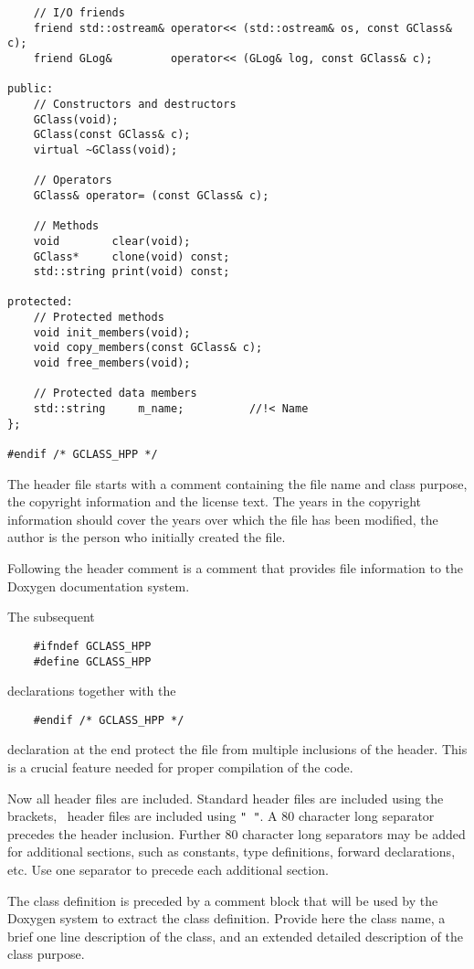 \documentclass{article}[12pt,a4]
\begin{document}
\begin{verbatim}
    // I/O friends
    friend std::ostream& operator<< (std::ostream& os, const GClass& c);
    friend GLog&         operator<< (GLog& log, const GClass& c);

public:
    // Constructors and destructors
    GClass(void);
    GClass(const GClass& c);
    virtual ~GClass(void);
 
    // Operators
    GClass& operator= (const GClass& c);

    // Methods
    void        clear(void);
    GClass*     clone(void) const;
    std::string print(void) const;
  
protected:
    // Protected methods
    void init_members(void);
    void copy_members(const GClass& c);
    void free_members(void);

    // Protected data members
    std::string     m_name;          //!< Name
};

#endif /* GCLASS_HPP */
\end{verbatim}

The header file starts with a comment containing the file name and class purpose, the
copyright information and the license text.
The years in the copyright information should cover the years over which the file has been
modified, the author is the person who initially created the file.

Following the header comment is a comment that provides file information to the
Doxygen documentation system.

The subsequent
\begin{verbatim}
    #ifndef GCLASS_HPP
    #define GCLASS_HPP
\end{verbatim}
declarations together with the 
\begin{verbatim}
    #endif /* GCLASS_HPP */
\end{verbatim}
declaration at the end protect the file from multiple inclusions of the header.
This is a crucial feature needed for proper compilation of the code.

Now all header files are included.
Standard header files are included using the {\tt < >} brackets, \this\ header files are included
using {\tt " "}.
A 80 character long separator precedes the header inclusion.
Further 80 character long separators may be added for additional sections, such as
constants, type definitions, forward declarations, etc.
Use one separator to precede each additional section.

The class definition is preceded by a comment block that will be used by the Doxygen system
to extract the class definition.
Provide here the class name, a brief one line description of the class, and an extended
detailed description of the class purpose.
\end{document}
